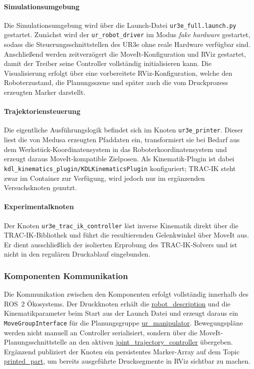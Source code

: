             \paragraph{Simulationsumgebung}
            Die Simulationsumgebung wird über die Launch-Datei \texttt{ur3e\_full.launch.py} gestartet.
            Zunächst wird der \texttt{ur\_robot\_driver} im Modus \textit{fake hardware} gestartet,
            sodass die Steuerungsschnittstellen des UR3e ohne reale Hardware verfügbar sind.
            Anschließend werden zeitverzögert die MoveIt-Konfiguration und RViz gestartet,
            damit der Treiber seine Controller vollständig initialisieren kann.
            Die Visualisierung erfolgt über eine vorbereitete RViz-Konfiguration,
            welche den Roboterzustand, die Planungsszene und später auch die vom Druckprozess erzeugten Marker darstellt.
            
            \paragraph{Trajektoriensteuerung}
            Die eigentliche Ausführungslogik befindet sich im Knoten \texttt{ur3e\_printer}.
            Dieser liest die von Medusa erzeugten Pfaddaten ein,
            transformiert sie bei Bedarf aus dem Werkstück-Koordinatensystem in das Roboterkoordinatensystem
            und erzeugt daraus MoveIt-kompatible Zielposen.
            Als Kinematik-Plugin ist dabei \texttt{kdl\_kinematics\_plugin/KDLKinematicsPlugin} konfiguriert;
            TRAC-IK steht zwar im Container zur Verfügung, wird jedoch nur im ergänzenden Versuchsknoten genutzt.

            \paragraph{Experimentalknoten}
            Der Knoten \texttt{ur3e\_trac\_ik\_controller} löst inverse Kinematik direkt über die TRAC-IK-Bibliothek
            und führt die resultierenden Gelenkwinkel über MoveIt aus.
            Er dient ausschließlich der isolierten Erprobung des TRAC-IK-Solvers
            und ist nicht in den regulären Druckablauf eingebunden.

            \subsubsection{Komponenten Kommunikation}
            Die Kommunikation zwischen den Komponenten erfolgt vollständig innerhalb des ROS~2 Ökosystems.
            Der Druckknoten erhält die \url{robot\_description} und die Kinematikparameter beim Start aus der Launch Datei
            und erzeugt daraus ein \texttt{Move\-Group\-Interface} für die Planungsgruppe \url{ur\_manipulator}.
            Bewegungspläne werden nicht manuell an Controller serialisiert,
            sondern über die MoveIt-Planungsschnittstelle an den aktiven \url{joint\_trajectory\_controller} übergeben.
            Ergänzend publiziert der Knoten ein persistentes Marker-Array auf dem Topic \url{printed\_part},
            um bereits ausgeführte Drucksegmente in RViz sichtbar zu machen.

